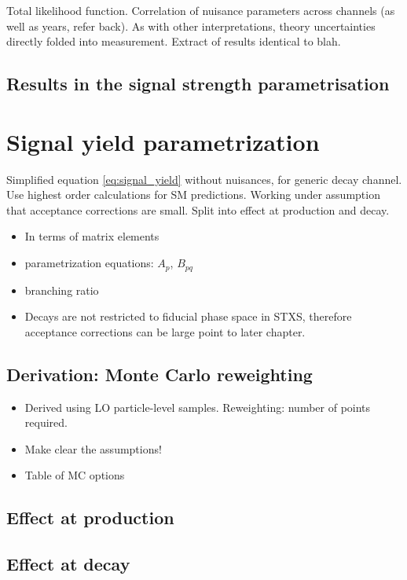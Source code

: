 Total likelihood function. Correlation of nuisance parameters across channels (as well as years, refer back). As with other interpretations, theory uncertainties directly folded into measurement. Extract of results identical to blah.

\subsection{Results in the signal strength parametrisation}


\section{Signal yield parametrization}\label{sec:eft_parametrisation}
Simplified equation \ref{eq:signal_yield} without nuisances, for generic decay channel. Use highest order calculations for SM predictions. Working under assumption that acceptance corrections are small. Split into effect at production and decay. 

\begin{itemize}
    \item In terms of matrix elements
    \item parametrization equations: $A_p$, $B_{pq}$
    \item branching ratio
    \item Decays are not restricted to fiducial phase space in STXS, therefore acceptance corrections can be large point to later chapter.
\end{itemize}



\subsection{Derivation: Monte Carlo reweighting}
\begin{itemize}
    \item Derived using LO particle-level samples. Reweighting: number of points required.
    \item Make clear the assumptions!
    \item Table of MC options
\end{itemize}

\subsection{Effect at production}

\subsection{Effect at decay}

